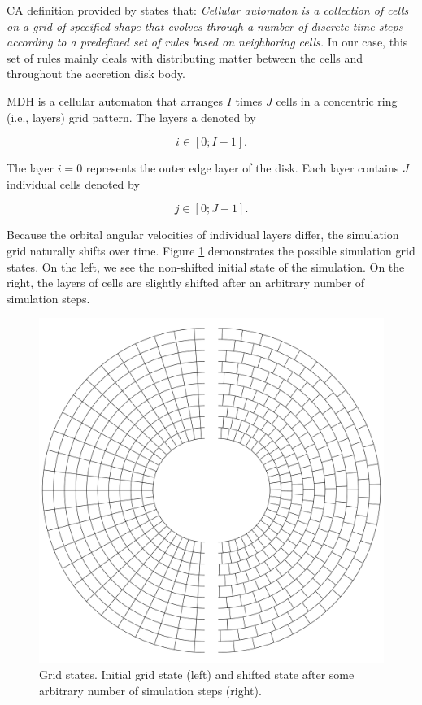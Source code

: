     CA definition provided by \cite{wolfram2002} states that: \emph{Cellular automaton is a collection of cells on a grid of specified shape that evolves through a number of discrete time steps according to a predefined set of rules based on neighboring cells.} In our case, this set of rules mainly deals with distributing matter between the cells and throughout the accretion disk body.

    MDH is a cellular automaton that arranges $I$ times $J$ cells in a concentric ring (i.e., layers) grid pattern. The layers a denoted by 

    \begin{equation}
        i \in [0;I-1].
    \end{equation}

    The layer $i=0$ represents the outer edge layer of the disk. Each layer contains $J$ individual cells denoted by

    \begin{equation}
        j \in [0;J-1].
    \end{equation}

    Because the orbital angular velocities of individual layers differ, the simulation grid naturally shifts over time. Figure \ref{fig:grid_states} demonstrates the possible simulation grid states. On the left, we see the non-shifted initial state of the simulation. On the right, the layers of cells are slightly shifted after an arbitrary number of simulation steps.

    \begin{figure}[H]
    \centering
    \includegraphics[width=\columnwidth]{img/grid_states.pdf}
    \caption{Grid states. Initial grid state (left) and shifted state after some arbitrary number of simulation steps (right).}
    \label{fig:grid_states}
    \end{figure}


